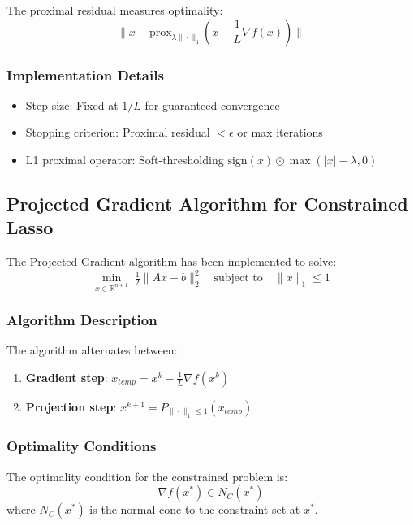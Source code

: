 \documentclass[11pt,a4paper]{article}
\begin{document}
The proximal residual measures optimality:
\[ \|x - \text{prox}_{\lambda\|\cdot\|_1}(x - \frac{1}{L}\nabla f(x))\| \]

\subsubsection{Implementation Details}

\begin{itemize}
    \item Step size: Fixed at $1/L$ for guaranteed convergence
    \item Stopping criterion: Proximal residual $< \epsilon$ or max iterations
    \item L1 proximal operator: Soft-thresholding $\text{sign}(x) \odot \max(|x| - \lambda, 0)$
\end{itemize}

\subsection{Projected Gradient Algorithm for Constrained Lasso}

The Projected Gradient algorithm has been implemented to solve:
\begin{equation}
    \min_{x \in \mathbb{R}^{n+1}} \; \tfrac{1}{2}\|Ax - b\|_2^2 \quad \text{subject to} \quad \|x\|_1 \leq 1
\end{equation}

\subsubsection{Algorithm Description}

The algorithm alternates between:
\begin{enumerate}
    \item \textbf{Gradient step}: $x_{temp} = x^k - \frac{1}{L}\nabla f(x^k)$
    \item \textbf{Projection step}: $x^{k+1} = P_{\|\cdot\|_1 \leq 1}(x_{temp})$
\end{enumerate}

\subsubsection{Optimality Conditions}

The optimality condition for the constrained problem is:
\[ \nabla f(x^*) \in N_C(x^*) \]
where $N_C(x^*)$ is the normal cone to the constraint set at $x^*$.
\end{document}
